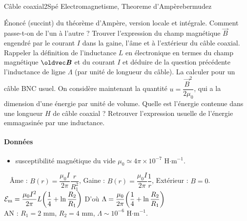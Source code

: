\begin{exercise}{Câble coaxial}{2}{Spé}
{Electromagnetisme, Theoreme d'Ampère}{bermudez}

\begin{questions}
    \questioncours Énoncé (succint) du théorème d'Ampère, version locale et intégrale. Comment passe-t-on de l'un à l'autre ?
    \question  Trouver l'expression du champ magnétique $\vec{B}$ engendré par le courant $I$ dans la gaine, l'âme et à l'extérieur du câble coaxial.
    \question Rappeler la définition de l'inductance $L$ en électronique en termes du champ magnétique $\vB$ et du courant $I$ et déduire de la question précédente l'inductance de ligne $\Lambda$ (par unité de longueur du câble). La calculer pour un câble BNC usuel.
    \question On considère maintenant la quantité $u = \dfrac{\vec{B}^2}{2\mu_0}$, qui a la dimension d'une énergie par unité de volume. Quelle est l'énergie contenue dans  une longueur $H$ de câble coaxial ?
    \question Retrouver l'expression usuelle de l'énergie emmagasinée par une inductance.
\end{questions}

\paragraph{Données}

\begin{itemize}
    \item susceptibilité magnétique du vide $\mu_0 \simeq 4\pi \times 10^{-7}$ H$\cdot\text{m}^{-1}$.
\end{itemize}

\end{exercise}

\begin{solution}
    \begin{questions}
        \question ~
        \question Âme : $B(r) = \dfrac{\mu_0 I}{2\pi}\dfrac{r}{R_1^2}$, Gaine : $B(r) = \dfrac{\mu_0 I}{2\pi}\dfrac{1}{r}$, Extérieur : $B = 0$.
        \question $\mathcal{E}_\text{m} = \dfrac{\mu_0 I^2}{2\pi} L\qty(\dfrac{1}{4} + \ln\dfrac{R_2}{R_1})$
        \question D'où $\Lambda = \dfrac{\mu_0}{2\pi}\qty(\dfrac{1}{4} + \ln\dfrac{R_2}{R_1})$ \\
        AN : $R_1 = 2$ mm, $R_2 = 4$ mm, $\Lambda \sim 10^{-6}$ H$\cdot\text{m}^{-1}$.
    \end{questions}
\end{solution}
